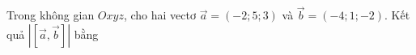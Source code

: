 \begin{ex}
Trong không gian $Oxyz$, cho hai vectơ $\vec a=(-2;5;3)$ và $\vec b=(-4;1;-2)$. Kết quả $\left|\left[\vec a,\vec b\right]\right|$ bằng
\end{ex}
